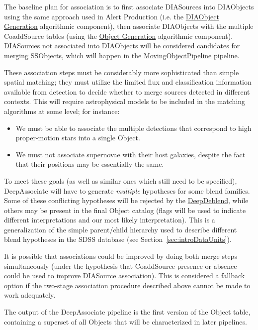The baseline plan for association is to first associate DIASources into DIAObjects using the same approach used in Alert Production (i.e. the \hyperref[sec:acDIAObjectGeneration]{DIAObject Generation} algorithmic component), then associate DIAObjects with the multiple CoaddSource tables (using the \hyperref[sec:acObjectGeneration]{Object Generation} algorithmic component).  DIASources not associated into DIAObjects will be considered candidates for merging SSObjects, which will happen in the \hyperref[sec:drpMovingObjectPipeline]{MovingObjectPipeline} pipeline.

These association steps must be considerably more sophisticated than simple spatial matching; they must utilize the limited flux and classification information available from detection to decide whether to merge sources detected in different contexts.  This will require astrophysical models to be included in the matching algorithms at some level; for instance:
\begin{itemize}
\item We must be able to associate the multiple detections that correspond to high proper-motion stars into a single Object.
\item We must not associate supernovae with their host galaxies, despite the fact that their positions may be essentially the same.
\end{itemize}
To meet these goals (as well as similar ones which still need to be specified), DeepAssociate will have to generate \emph{multiple} hypotheses for some blend families.  Some of these conflicting hypotheses will be rejected by the \hyperref[sec:drpDeepDeblend]{DeepDeblend}, while others may be present in the final Object catalog (flags will be used to indicate different interpretations and our most likely interpretation).  This is a generalization of the simple parent/child hierarchy used to describe different blend hypotheses in the SDSS database (see Section~\ref{sec:introDataUnits}).

It is possible that associations could be improved by doing both merge steps simultaneously (under the hypothesis that CoaddSource presence or absence could be used to improve DIASource association).  This is considered a fallback option if the two-stage association procedure described above cannot be made to work adequately.

The output of the DeepAssociate pipeline is the first version of the Object table, containing a superset of all Objects that will be characterized in later pipelines.

